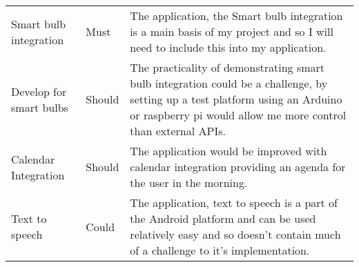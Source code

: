 \begin{longtable}[]{@{}lll@{}}
\begin{minipage}[t]{0.22\columnwidth}\raggedright\strut
Smart bulb integration\strut
\end{minipage} & \begin{minipage}[t]{0.10\columnwidth}\raggedright\strut
Must\strut
\end{minipage} & \begin{minipage}[t]{0.60\columnwidth}\raggedright\strut
The application, the Smart bulb integration is a main basis of my
project and so I will need to include this into my application.\strut
\end{minipage}\tabularnewline
\begin{minipage}[t]{0.22\columnwidth}\raggedright\strut
Develop for smart bulbs\strut
\end{minipage} & \begin{minipage}[t]{0.10\columnwidth}\raggedright\strut
Should\strut
\end{minipage} & \begin{minipage}[t]{0.60\columnwidth}\raggedright\strut
The practicality of demonstrating smart bulb integration could be a
challenge, by setting up a test platform using an Arduino or raspberry
pi would allow me more control than external APIs.\strut
\end{minipage}\tabularnewline
\begin{minipage}[t]{0.22\columnwidth}\raggedright\strut
Calendar Integration\strut
\end{minipage} & \begin{minipage}[t]{0.10\columnwidth}\raggedright\strut
Should\strut
\end{minipage} & \begin{minipage}[t]{0.60\columnwidth}\raggedright\strut
The application would be improved with calendar integration providing an
agenda for the user in the morning.\strut
\end{minipage}\tabularnewline
\begin{minipage}[t]{0.22\columnwidth}\raggedright\strut
Text to speech\strut
\end{minipage} & \begin{minipage}[t]{0.10\columnwidth}\raggedright\strut
Could\strut
\end{minipage} & \begin{minipage}[t]{0.60\columnwidth}\raggedright\strut
The application, text to speech is a part of the Android platform and
can be used relatively easy and so doesn't contain much of a challenge
to it's implementation.\strut
\end{minipage}\tabularnewline
\bottomrule
\end{longtable}

